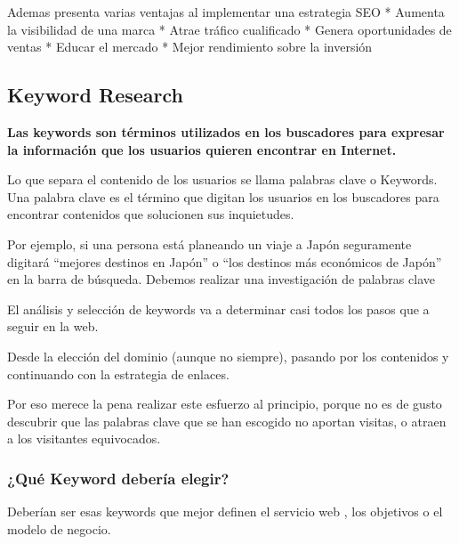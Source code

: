 \documentclass[11pt]{article}
\begin{document}
Ademas presenta varias ventajas al implementar una estrategia SEO *
Aumenta la visibilidad de una marca * Atrae tráfico cualificado * Genera
oportunidades de ventas * Educar el mercado * Mejor rendimiento sobre la
inversión

    \hypertarget{keyword-research}{%
\subsection{Keyword Research}\label{keyword-research}}

\textbf{Las keywords son términos utilizados en los buscadores para
expresar la información que los usuarios quieren encontrar en Internet.}

Lo que separa el contenido de los usuarios se llama palabras clave o
Keywords. Una palabra clave es el término que digitan los usuarios en
los buscadores para encontrar contenidos que solucionen sus inquietudes.

Por ejemplo, si una persona está planeando un viaje a Japón seguramente
digitará ``mejores destinos en Japón'' o ``los destinos más económicos
de Japón'' en la barra de búsqueda. Debemos realizar una investigación
de palabras clave

    El análisis y selección de keywords va a determinar casi todos los pasos
que a seguir en la web.

Desde la elección del dominio (aunque no siempre), pasando por los
contenidos y continuando con la estrategia de enlaces.

Por eso merece la pena realizar este esfuerzo al principio, porque no es
de gusto descubrir que las palabras clave que se han escogido no aportan
visitas, o atraen a los visitantes equivocados.

    \hypertarget{quuxe9-keyword-deberuxeda-elegir}{%
\subsubsection{¿Qué Keyword debería
elegir?}\label{quuxe9-keyword-deberuxeda-elegir}}

Deberían ser esas keywords que mejor definen el servicio web , los
objetivos o el modelo de negocio.
\end{document}
